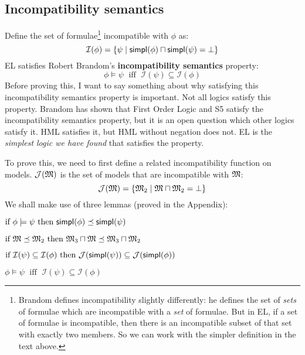 \subsection{Incompatibility semantics}\label{incompatibility}

\NI Define the set of formulae\footnote{Brandom \cite{brandom} defines
  incompatibility slightly differently: he defines the set of
  \emph{sets} of formulae which are incompatible with a \emph{set} of
  formulae.  But in EL, if a set of formulae is incompatible, then
  there is an incompatible subset of that set with exactly two
  members.  So we can work with the simpler definition in the text
  above.}  incompatible with $\phi$ as:
\[
\mathcal{I}(\phi) = \{ \psi \; | \; \mathsf{simpl}(\phi) \sqcap \mathsf{simpl}(\psi) = \bot \}
\]
EL satisfies Robert Brandom's \textbf{incompatibility semantics}  property:
\[
\phi \models \psi \; \mbox{ iff } \; \mathcal{I}(\psi) \subseteq \mathcal{I}(\phi)
\]
Before proving this, I want to say something about why satisfying this incompatibility semantics property is important.
Not all logics satisfy this property. 
Brandom has shown that First Order Logic and S5 satisfy the incompatibility semantics property, but it is an open question which other logics satisfy it.
HML satisfies it, but HML without negation does not.
EL is the \emph{simplest logic we have found} that satisfies the property.

To prove this, we need to first define a related incompatibility function on  models.
$\mathcal{J}(\frak{M})$ is the set of models that are incompatible with $\frak{M}$:
\[
\mathcal{J}(\frak{M}) = \{ \frak{M}_2 \; | \; \frak{M} \sqcap \frak{M}_2 = \bot \}
\]
We shall make use of three lemmas (proved in the Appendix):
\begin{lemma}
\label{inc1}
$\mbox{if }\phi \models \psi \mbox{ then } \mathsf{simpl}(\phi) \preceq \mathsf{simpl}(\psi)$
\end{lemma}
\begin{lemma}
\label{inc2}
$\mbox{if }\frak{M} \preceq \frak{M}_2 \mbox{ then } \frak{M}_3 \sqcap \frak{M} \preceq \frak{M}_3 \sqcap \frak{M}_2$
\end{lemma}
\begin{lemma}
\label{inc3}
$\mbox{if }\mathcal{I}(\psi) \subseteq \mathcal{I}(\phi) \mbox{ then } \mathcal{J}(\mathsf{simpl}(\psi)) \subseteq \mathcal{J}(\mathsf{simpl}(\phi))$
\end{lemma}

\begin{theorem}
$\phi \models \psi \; \mbox{ iff } \; \mathcal{I}(\psi) \subseteq \mathcal{I}(\phi)$
\end{theorem}

